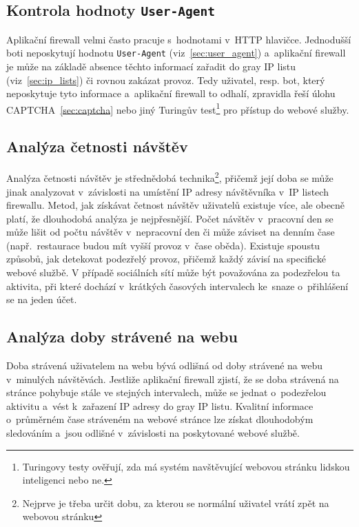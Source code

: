 \subsection*{Kontrola hodnoty \texttt{User-Agent}}
Aplikační firewall velmi často pracuje s~hodnotami v~HTTP hlavičce. Jednodušší boti neposkytují hodnotu \texttt{User-Agent} (viz~\ref{sec:user_agent}) a~aplikační firewall je může na základě absence těchto informací zařadit do gray IP listu (viz~\ref{sec:ip_lists}) či rovnou zakázat provoz. Tedy uživatel, resp. bot, který neposkytuje tyto informace a~aplikační firewall to odhalí, zpravidla řeší úlohu CAPTCHA~\ref{sec:captcha} nebo jiný Turingův test\footnote{Turingovy testy ověřují, zda má systém navštěvující webovou stránku lidskou inteligenci nebo ne.} pro přístup do webové služby.

\subsection*{Analýza četnosti návštěv}
Analýza četnosti návštěv je střednědobá technika\footnote{Nejprve je třeba určit dobu, za kterou se normální uživatel vrátí zpět na webovou stránku}, přičemž její doba se může jinak analyzovat v~závislosti na umístění IP adresy návštěvníka v~IP listech firewallu. Metod, jak získávat četnost návštěv uživatelů existuje více, ale obecně platí, že dlouhodobá analýza je nejpřesnější. Počet návštěv v~pracovní den se může lišit od počtu návštěv v~nepracovní den či může záviset na denním čase (např.~restaurace budou mít vyšší provoz v~čase oběda). Existuje spoustu způsobů, jak detekovat podezřelý provoz, přičemž každý závisí na specifické webové službě. V případě sociálních sítí může být považována za podezřelou ta aktivita, při které dochází v~krátkých časových intervalech ke~snaze o~přihlášení se na jeden účet.

\subsection*{Analýza doby strávené na webu}
\label{sec:time_analysis}
Doba strávená uživatelem na webu bývá odlišná od doby strávené na webu v~minulých návštěvách. Jestliže aplikační firewall zjistí, že se doba strávená na stránce pohybuje stále ve stejných intervalech, může se jednat o~podezřelou aktivitu a~vést k~zařazení IP adresy do gray IP listu. Kvalitní informace o~průměrném čase stráveném na webové stránce lze získat dlouhodobým sledováním a~jsou odlišné v~závislosti na poskytované webové službě.

